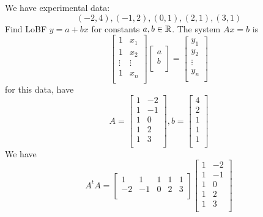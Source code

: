 \documentclass{article}
\begin{document}
    \begin{example}
      We have experimental data:
      \[
        (-2, 4), (-1, 2), (0, 1), (2, 1), (3, 1)
      \]
      Find LoBF $y = a + bx$ for constants $a, b \in \mathbb{R}$. The system $Ax = b$ is \[
        \begin{bmatrix}
          1 & x_1\\
          1 & x_2\\
          \vdots & \vdots\\
          1 & x_n\\
        \end{bmatrix}
        \begin{bmatrix}
          a\\b\\
        \end{bmatrix} =
        \begin{bmatrix}
          y_1\\y_2\\\vdots\\y_n\\
        \end{bmatrix}
      \]
      for this data, have \[
        A =
        \begin{bmatrix}
          1 & -2\\
          1 & -1\\
          1 & 0\\
          1 & 2\\
          1 & 3\\
        \end{bmatrix}, b =
        \begin{bmatrix}
          4\\2\\1\\1\\1\\
        \end{bmatrix}
      \]
      We have \[
        A^tA =
        \begin{bmatrix}
          1 & 1 & 1 & 1 & 1\\
          -2 & -1 & 0 & 2 & 3\\
        \end{bmatrix}
        \begin{bmatrix}
          1 & -2\\
          1 & -1\\
          1 & 0\\
          1 & 2\\
          1 & 3\\

\end{bmatrix}\]
\end{example}
\end{document}
